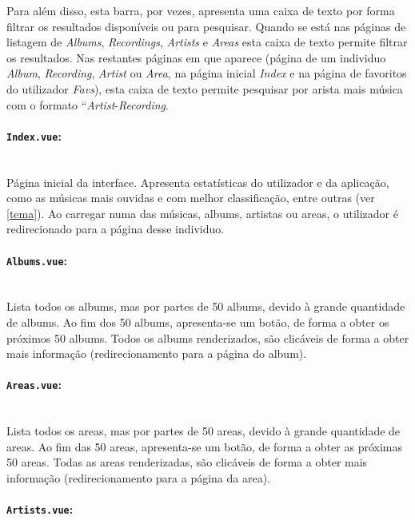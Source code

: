\documentclass{article}
\begin{document}
Para além disso, esta barra, por vezes, apresenta uma caixa de texto por forma filtrar os resultados disponíveis ou para pesquisar. Quando se está nas páginas de listagem de \textit{Albums}, \textit{Recordings}, \textit{Artists} e \textit{Areas} esta caixa de texto permite filtrar os resultados. Nas restantes páginas em que aparece (página de um individuo \textit{Album}, \textit{Recording}, \textit{Artist} ou \textit{Area}, na página inicial \textit{Index} e na página de favoritos do utilizador \textit{Favs}), esta caixa de texto permite pesquisar por arista mais música com o formato ``\textit{Artist}-\textit{Recording}.

\paragraph{\texttt{Index.vue}:}\mbox{}\\

Página inicial da interface. Apresenta estatísticas do utilizador e da aplicação, como as músicas mais ouvidas e com melhor classificação, entre outras (ver \ref{tema}). Ao carregar numa das músicas, albums, artistas ou areas, o utilizador é redirecionado para a página desse individuo.

\paragraph{\texttt{Albums.vue}:}\mbox{}\\

Lista todos os albums, mas por partes de 50 albums, devido à grande quantidade de albums. Ao fim dos 50 albums, apresenta-se um botão, de forma a obter os próximos 50 albums. Todos os albums renderizados, são clicáveis de forma a obter mais informação (redirecionamento para a página do album).

\paragraph{\texttt{Areas.vue}:}\mbox{}\\

Lista todos os areas, mas por partes de 50 areas, devido à grande quantidade de areas. Ao fim das 50 areas, apresenta-se um botão, de forma a obter as próximas 50 areas. Todas as areas renderizadas, são clicáveis de forma a obter mais informação (redirecionamento para a página da area).

\paragraph{\texttt{Artists.vue}:}\mbox{}\\
\end{document}
